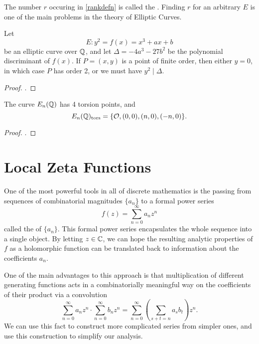 \documentclass[12pt, a4paper]{report}
\begin{document}
\begin{defn}
  The number $r$ occuring in \autoref{rankdefn} is called the
  . Finding $r$ for an arbitrary $E$ is one of the main
  problems in the theory of Elliptic Curves.
\end{defn}

\begin{thm} \label{thm:nagelllutz}
  Let
  \[E: y^2 = f(x) = x^3 + ax + b\]
  be an elliptic curve over ${\mathbb Q}$, and let $\Delta = -4a^3 -27b^2$ be the
  polynomial discriminant of $f(x)$. If $P = (x,y)$ is a point of finite order,
  then either $y = 0$, in which case $P$ has order 2, or we must have $y^2 \mid \Delta$.
\end{thm}
\begin{proof}
  \cite[See][Chapter II, pages 49-56]{rational}.
\end{proof}

\begin{prop}
  The curve $E_n({\mathbb Q})$ has 4 torsion points, and
  \[E_n({\mathbb Q})_{\textnormal{tors}} = \{{\mathcal O}, (0,0), (n,0), (-n,0)\}.\]
\end{prop}

\begin{proof}
  \cite[See][Chapter I-9, pages 44-45]{koblitz}.
\end{proof}

\section{Local Zeta Functions}

One of the most powerful tools in all of discrete mathematics is the passing
from sequences of combinatorial magnitudes $\{a_n\}$ to a formal power series
\[f(z) = \sum\limits_{n=0}^\infty a_nz^n\]
called the  of $\{a_n\}.$ This formal power series
encapsulates the whole sequence into a single object. By letting $z \in {\mathbb C}$,
we can hope the
resulting analytic properties of $f$ as a holomorphic function can be translated
back to information about the coefficients $a_n$.

One of the main advantages to
this approach is that multiplication of different generating functions acts in
a combinatorially meaningful way on the coefficients of their product via a
convolution
\[\sum\limits_{n=0}^\infty a_n z^n \cdot \sum_{n=0}^\infty b_n z^n =
\sum\limits_{n=0}^\infty \left( \sum\limits_{s+t = n} a_sb_t \right)z^n.\]
We can use this fact to construct more complicated series from
simpler ones, and use this construction to simplify our analysis.
\end{document}
